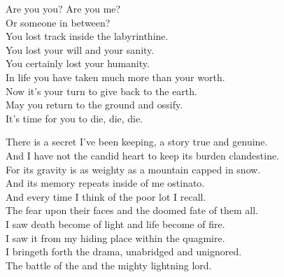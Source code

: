 
Are you you? Are you me? \\
Or someone in between? \\
You lost track inside the labyrinthine. \\

You lost your will and your sanity. \\
You certainly lost your humanity. \\

In life you have taken much more than your worth. \\
Now it's your turn to give back to the earth. \\

May you return to the ground and ossify. \\
It's time for you to die, die, die. \\









There is a secret I've been keeping, a story true and genuine. \\
And I have not the candid heart to keep its burden clandestine. \\

For its gravity is as weighty as a mountain capped in snow. \\
And its memory repeats inside of me ostinato. \\

And every time I think of the poor lot I recall. \\
The fear upon their faces and the doomed fate of them all. \\

I saw death become of light and life become of fire. \\
I saw it from my hiding place within the quagmire. \\

I bringeth forth the drama, unabridged and unignored. \\
The battle of the  and the mighty lightning lord. \\

